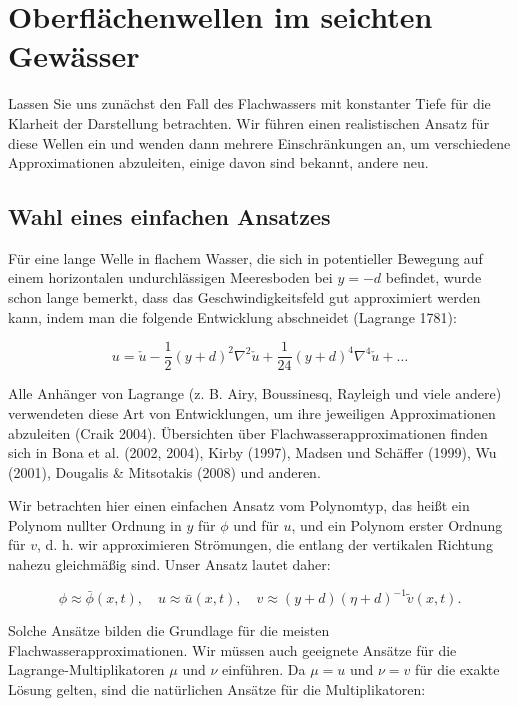 %
%
%
%
\section{Oberflächenwellen im seichten Gewässer
\label{luke:section:teil1}}

Lassen Sie uns zunächst den Fall des Flachwassers mit konstanter Tiefe für die Klarheit der Darstellung betrachten. Wir führen einen realistischen Ansatz für diese Wellen ein und wenden dann mehrere Einschränkungen an, um verschiedene Approximationen abzuleiten, einige davon sind bekannt, andere neu.

\subsection{Wahl eines einfachen Ansatzes}

Für eine lange Welle in flachem Wasser, die sich in potentieller Bewegung auf einem horizontalen undurchlässigen Meeresboden bei \( y = -d \) befindet, wurde schon lange bemerkt, dass das Geschwindigkeitsfeld gut approximiert werden kann, indem man die folgende Entwicklung abschneidet (Lagrange 1781):

\[ u = \check{u} - \frac{1}{2} (y + d)^2 \nabla^2 \check{u} + \frac{1}{24} (y + d)^4 \nabla^4 \check{u} + \ldots \]

Alle Anhänger von Lagrange (z. B. Airy, Boussinesq, Rayleigh und viele andere) verwendeten diese Art von Entwicklungen, um ihre jeweiligen Approximationen abzuleiten (Craik 2004). Übersichten über Flachwasserapproximationen finden sich in Bona et al. (2002, 2004), Kirby (1997), Madsen und Schäffer (1999), Wu (2001), Dougalis & Mitsotakis (2008) und anderen.

Wir betrachten hier einen einfachen Ansatz vom Polynomtyp, das heißt ein Polynom nullter Ordnung in \( y \) für \( \phi \) und für \( u \), und ein Polynom erster Ordnung für \( v \), d. h. wir approximieren Strömungen, die entlang der vertikalen Richtung nahezu gleichmäßig sind. Unser Ansatz lautet daher:

\[ \phi \approx \bar{\phi}(x, t), \quad u \approx \bar{u}(x, t), \quad v \approx (y + d) (\eta + d)^{-1} \tilde{v}(x, t). \]

Solche Ansätze bilden die Grundlage für die meisten Flachwasserapproximationen. Wir müssen auch geeignete Ansätze für die Lagrange-Multiplikatoren \( \mu \) und \( \nu \) einführen. Da \( \mu = u \) und \( \nu = v \) für die exakte Lösung gelten, sind die natürlichen Ansätze für die Multiplikatoren:

